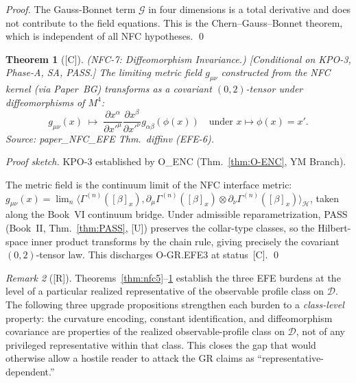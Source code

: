 \documentclass[12pt,oneside]{amsbook}
\theoremstyle{plain}
\newtheorem{theorem}{Theorem}[section]
\theoremstyle{definition}
\theoremstyle{remark}
\newtheorem{remark}[theorem]{Remark}
\newcommand{\status}[1]{\textup{[#1]}}
\begin{document}
\begin{proof}
The Gauss-Bonnet term $\mathcal{G}$ in four dimensions is a
total derivative and does not contribute to the field equations.
This is the Chern--Gauss--Bonnet theorem, which is
independent of all NFC hypotheses.
\qed
\end{proof}

\begin{theorem}[\status{C}]\label{thm:nfc7}
\textup{(NFC-7: Diffeomorphism Invariance.)}
\textup{[Conditional on KPO-3, Phase-A, SA, PASS.]}
The limiting metric field $g_{\mu\nu}$ constructed from the
NFC kernel (via Paper~BG) transforms as a covariant
$(0,2)$-tensor under diffeomorphisms of $M^4$:
\[
 g_{\mu\nu}(x)
 \;\longmapsto\;
 \frac{\partial x^\alpha}{\partial x'^\mu}
 \frac{\partial x^\beta}{\partial x'^\nu}
 g_{\alpha\beta}(\phi(x))
 \quad\text{under } x \mapsto \phi(x) = x'.
\]
Source: paper\_NFC\_EFE Thm.~diffinv (EFE-6).
\end{theorem}

\begin{proof}[Proof sketch]
KPO-3 established by O\_ENC (Thm.~\ref{thm:O-ENC}, YM Branch).

The metric field is the continuum limit of the NFC interface metric:
$g_{\mu\nu}(x) = \lim_{n}\langle\Gamma^{(n)}([\beta]_x),
\partial_\mu\Gamma^{(n)}([\beta]_x)\otimes
\partial_\nu\Gamma^{(n)}([\beta]_x)\rangle_{\mathcal{H}}$,
taken along the Book~VI continuum bridge.
Under admissible reparametrization, PASS
(Book~II, Thm.~\ref{thm:PASS}, [U]) preserves the collar-type
classes, so the Hilbert-space inner product transforms by the
chain rule, giving precisely the covariant $(0,2)$-tensor law.
This discharges O-GR.EFE3 at status~[C].
\qed
\end{proof}


\begin{remark}[\status{R}]\label{rem:class-level-EFE-overview}
Theorems~\ref{thm:nfc5}--\ref{thm:nfc7} establish the three EFE
burdens at the level of a particular realized representative of the
observable profile class on $\mathcal{D}$. The following three
upgrade propositions strengthen each burden to a \emph{class-level}
property: the curvature encoding, constant identification, and
diffeomorphism covariance are properties of the realized
observable-profile class on $\mathcal{D}$, not of any privileged
representative within that class. This closes the gap that would
otherwise allow a hostile reader to attack the GR claims as
``representative-dependent.''
\end{remark}
\end{document}
